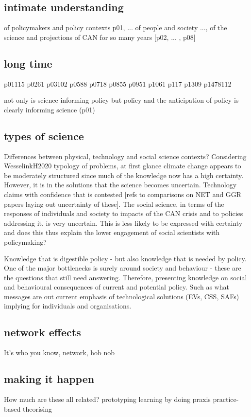 \subsection{intimate understanding}
of policymakers and policy contexts p01, ...
of people and society ..., of the science and projections of CAN for so many years [p02, ... , p08]
\subsection{long time} {p01}{115} {p02}{61} {p03}{102} {p05}{88} {p07}{18} {p08}{55} {p09}{51} {p10}{61} {p11}{7} {p13}{09} {p14}{78}{112}

not only is science informing policy but policy and the anticipation of policy is clearly informing science (p01) 


\subsection{types of science}
Differences between physical, technology and social science contexts?
Considering WesselinkH2020 typology of problems, at first glance climate change appears to be moderately structured since much of the knowledge now has a high certainty. However, it is in the solutions that the science becomes uncertain. Technology claims with confidence that is contested [refs to comparisons on NET and GGR papers laying out uncertainty of these]. The social science, in terms of the responses of individuals and society to impacts of the CAN crisis and to policies addressing it, is very uncertain. This is less likely to be expressed with certainty and does this thus explain the lower engagement of social scientists with policymaking?

Knowledge that is digestible policy - but also knowledge that is needed by policy. One of the major bottlenecks is surely around society and behaviour - these are the questions that still need answering. Therefore, presenting knowledge on social and behavioural consequences of current and potential policy. Such as what messages are out current emphasis of technological solutions (EVs, CSS, SAFs) implying for individuals and organisations.

\subsection{network effects}
It's who you know, network, hob nob

\subsection{making it happen}
How much are these all related?
prototyping
learning by doing
praxis
practice-based theorising

